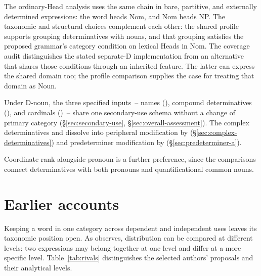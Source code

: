 \documentclass[12pt]{article}
\begin{document}
The ordinary-Head analysis uses the same chain in bare, partitive, and externally determined expressions: the word heads Nom, and Nom heads NP. The taxonomic and structural choices complement each other: the shared profile supports grouping determinatives with nouns, and that grouping satisfies the proposed grammar's category condition on lexical Heads in Nom. The coverage audit distinguishes the stated separate-D implementation from an alternative that shares those conditions through an inherited feature. The latter can express the shared domain too; the profile comparison supplies the case for treating that domain as Noun.

Under D-noun, the three specified inputs~-- names (), compound determinatives (), and cardinals ()~-- share one secondary-use schema without a change of primary category (§\ref{sec:secondary-use}, §\ref{sec:overall-assessment}). The complex determinatives  and  dissolve into peripheral modification by  (§\ref{sec:complex-determinatives}) and predeterminer modification by  (§\ref{sec:predeterminer-a}).

Coordinate rank alongside pronoun is a further preference, since the comparisons connect determinatives with both pronouns and quantificational common nouns.

\appendix

\section{Earlier accounts}\label{sec:historical}

Keeping a word in one category across dependent and independent uses leaves its taxonomic position open. As \textcite[232--235]{lyons1968} observes, distribution can be compared at different levels: two expressions may belong together at one level and differ at a more specific level. Table~\ref{tab:rivals} distinguishes the selected authors' proposals and their analytical levels.
\end{document}

